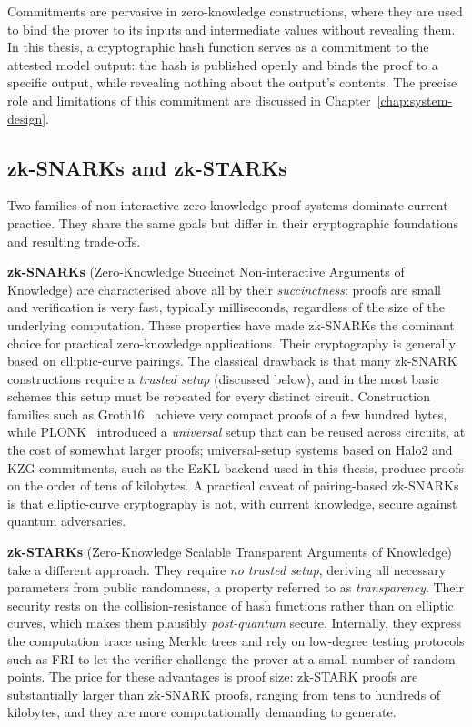 \medskip

Commitments are pervasive in zero-knowledge constructions, where they are used to bind the prover to its inputs and intermediate values without revealing them. In this thesis, a cryptographic hash function serves as a commitment to the attested model output: the hash is published openly and binds the proof to a specific output, while revealing nothing about the output's contents. The precise role and limitations of this commitment are discussed in Chapter~\ref{chap:system-design}.

\subsection{zk-SNARKs and zk-STARKs}
\label{subsec:bg-snark-stark}

Two families of non-interactive zero-knowledge proof systems dominate current practice. They share the same goals but differ in their cryptographic foundations and resulting trade-offs.

\medskip

\textbf{zk-SNARKs} (Zero-Knowledge Succinct Non-interactive Arguments of Knowledge) are characterised above all by their \emph{succinctness}: proofs are small and verification is very fast, typically milliseconds, regardless of the size of the underlying computation. These properties have made zk-SNARKs the dominant choice for practical zero-knowledge applications. Their cryptography is generally based on elliptic-curve pairings. The classical drawback is that many zk-SNARK constructions require a \emph{trusted setup} (discussed below), and in the most basic schemes this setup must be repeated for every distinct circuit. Construction families such as Groth16~\cite{groth2016size} achieve very compact proofs of a few hundred bytes, while PLONK~\cite{gabizon2019plonk} introduced a \emph{universal} setup that can be reused across circuits, at the cost of somewhat larger proofs; universal-setup systems based on Halo2 and KZG commitments, such as the EzKL backend used in this thesis, produce proofs on the order of tens of kilobytes. A practical caveat of pairing-based zk-SNARKs is that elliptic-curve cryptography is not, with current knowledge, secure against quantum adversaries.

\medskip

\textbf{zk-STARKs} (Zero-Knowledge Scalable Transparent Arguments of Knowledge) take a different approach. They require \emph{no trusted setup}, deriving all necessary parameters from public randomness, a property referred to as \emph{transparency}. Their security rests on the collision-resistance of hash functions rather than on elliptic curves, which makes them plausibly \emph{post-quantum} secure. Internally, they express the computation trace using Merkle trees and rely on low-degree testing protocols such as FRI to let the verifier challenge the prover at a small number of random points. The price for these advantages is proof size: zk-STARK proofs are substantially larger than zk-SNARK proofs, ranging from tens to hundreds of kilobytes, and they are more computationally demanding to generate.

